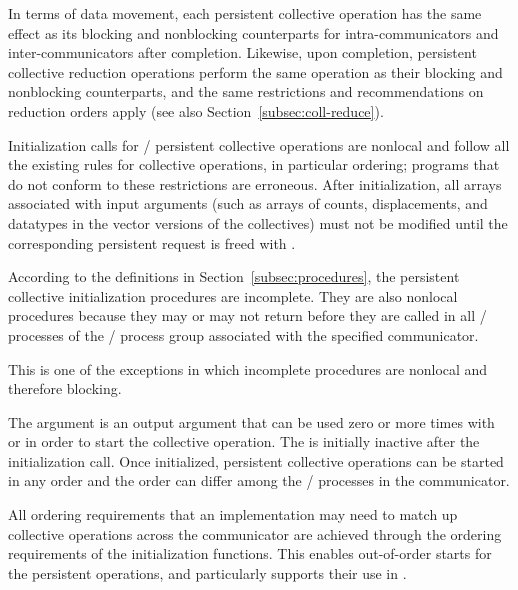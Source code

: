 In terms of data movement, each persistent collective operation has
the same effect as its blocking and nonblocking counterparts for intra-communicators and
inter-communicators after completion.
%
Likewise, upon completion,
persistent collective reduction operations
perform the same operation as their blocking and nonblocking counterparts,
and the same restrictions and recommendations on reduction orders apply (see also Section~\ref{subsec:coll-reduce}).

Initialization calls for
\MPI/ persistent collective operations
are nonlocal and
follow all the existing rules for
collective operations,
in particular ordering;
programs that do not conform to these restrictions
are erroneous.
%
After initialization,
all
arrays associated with input arguments
(such as arrays of counts, displacements, and
datatypes in the vector versions of the collectives)
must  not be modified
until the corresponding persistent request is freed with .

According to the definitions in Section~\ref{subsec:procedures},
the persistent collective initialization procedures are incomplete.
They are also nonlocal procedures because they may or may not return
before they are called in all \MPI/ processes of the \MPI/ process group
associated with the specified communicator.
\begin{users}
This is one of the exceptions in which incomplete procedures are nonlocal and therefore blocking.
\end{users}

The  argument is an output argument
that can be used zero or more times
with  or 
in order to start the collective operation.
The  is initially inactive after the initialization call.
%
Once initialized,
persistent collective operations can be started in any order
and the order can differ among the \MPI/ processes in the communicator.

\begin{rationale}
All ordering requirements that an implementation may need to match up collective operations across the communicator
are achieved through the ordering requirements of the initialization functions.  This enables out-of-order starts
for the persistent operations, and particularly supports their use in .
\end{rationale}

